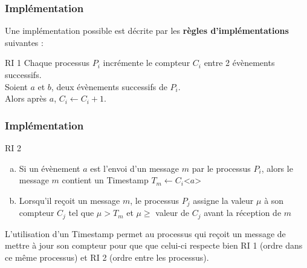 \documentclass[compress]{beamer}
\begin{document}


\begin{frame}
\frametitle{Implémentation}
Une implémentation possible est décrite par les  
\textbf{\color{cyan}règles d'implémentations }suivantes : \bigskip
\begin{block}{RI 1} 
Chaque processus $P_i$ incrémente le compteur $C_i$ entre 2 évènements successifs.\\
Soient $a$ et $b$, deux évènements successifs de $P_i$. \\
Alors après $a$, $C_i \leftarrow C_i + 1$.
\end{block}
\end{frame}

\begin{frame}
	\frametitle{Implémentation}
	\begin{block}{RI 2}
	\begin{enumerate}[(a)]
		\item Si un évènement $a$ est l'envoi d'un message $m$ par le processus $P_i$, alors le message $m$ contient un Timestamp $T_m \leftarrow C_i$<$a$>
		\item Lorsqu'il reçoit un message $m$, le processus $P_j$ assigne la valeur $\mu$ à son compteur $C_j$ tel que $\mu > T_m$ et $\mu \geq$ valeur de $C_j$ avant la réception de $m$
	\end{enumerate}
	\end{block}
	\bigskip
	L'utilisation d'un Timestamp permet au processus qui reçoit un message de mettre à jour son compteur pour que que celui-ci respecte bien RI 1 (ordre dans ce même processus) et RI 2 (ordre entre les processus).
\end{frame}
\end{document}
